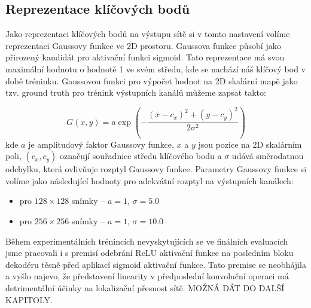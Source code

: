 \subsection{Reprezentace klíčových bodů}

Jako reprezentaci klíčových bodů na výstupu sítě si v tomto nastavení volíme reprezentaci Gaussovy funkce ve 2D prostoru. Gaussova funkce působí jako přirozený kandidát pro aktivační funkci sigmoid. Tato reprezentace má svou maximální hodnotu o hodnotě 1 ve svém středu, kde se nachází náš klíčový bod v době tréninku. Gaussovou funkci pro výpočet hodnot na 2D skalární mapě jako tzv. ground truth pro trénink výstupních kanálů můžeme zapsat takto:

\begin{equation}
    G(x, y) = a \exp\left(-\frac{(x - c_x)^2 + (y - c_y)^2}{2\sigma^2}\right)
\end{equation}
kde $a$ je amplitudový faktor Gaussovy funkce, $x$ a $y$ jsou pozice na 2D skalárním poli, $(c_x, c_y)$ označují souřadnice středu klíčového bodu a $\sigma$ udává směrodatnou odchylku, která ovlivňuje rozptyl Gaussovy funkce. Parametry Gaussovy funkce si volíme jako následující hodnoty pro adekvátní rozptyl na výstupních kanálech: 
\begin{itemize}
    \item pro $128 \times 128$ snímky -- $a=1$, $\sigma=5.0$
    \item pro $256 \times 256$ snímky -- $a=1$, $\sigma=10.0$
\end{itemize}

Během experimentálních trénincích nevyskytujících se ve finálních evaluacích jsme pracovali i s premisí odebrání ReLU aktivační funkce na posledním bloku dekodéru těsně před aplikací sigmoid aktivační funkce. Tato premise se neobhájila a vyšlo najevo, že představení linearity v předposlední konvoluční operaci má detrimentální účinky na lokalizační přesnost sítě. MOŽNÁ DÁT DO DALŠÍ KAPITOLY.
\endinput